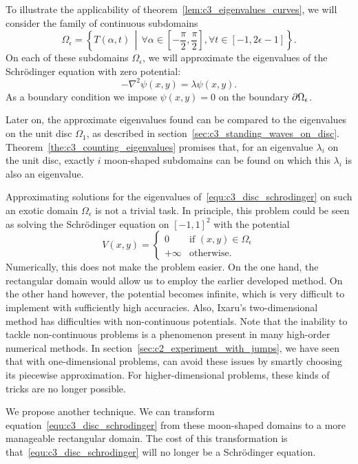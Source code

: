 To illustrate the applicability of theorem~\ref{lem:c3_eigenvalues_curves}, we will consider the family of continuous subdomains
$$
  \Omega_\epsilon = \left\{T(\alpha, t) \,\middle|\, \forall \alpha \in \left[-\frac{\pi}{2}, \frac{\pi}{2}\right], \forall t \in [-1, 2\epsilon - 1]  \right\}\text{.}
$$
On each of these subdomains $\Omega_\epsilon$, we will approximate the eigenvalues of the Schrödinger equation with zero potential:
\begin{equation}\label{equ:c3_disc_schrodinger}
  -\nabla^2 \psi(x, y) = \lambda \psi(x, y)\text{.}
\end{equation}
As a boundary condition we impose $\psi(x, y) = 0$ on the boundary $\partial\Omega_\epsilon$.

Later on, the approximate eigenvalues found can be compared to the eigenvalues on the unit disc $\Omega_1$, as described in section~\ref{sec:c3_standing_waves_on_disc}. Theorem~\ref{the:c3_counting_eigenvalues} promises that, for an eigenvalue $\lambda_i$ on the unit disc, exactly $i$ moon-shaped subdomains can be found on which this $\lambda_i$ is also an eigenvalue.

Approximating solutions for the eigenvalues of~\eqref{equ:c3_disc_schrodinger} on such an exotic domain $\Omega_\epsilon$ is not a trivial task. In principle, this problem could be seen as solving the Schrödinger equation on $[-1,1]^2$ with the potential
$$
  V(x, y) = \begin{cases}
    0       & \text{if $(x, y)\in \Omega_\epsilon$} \\
    +\infty & \text{otherwise.}
  \end{cases}
$$
Numerically, this does not make the problem easier. On the one hand, the rectangular domain would allow us to employ the earlier developed method. On the other hand however, the potential becomes infinite, which is very difficult to implement with sufficiently high accuracies. Also, Ixaru's two-dimensional method has difficulties with non-continuous potentials. Note that the inability to tackle non-continuous problems is a phenomenon present in many high-order numerical methods. In section~\ref{sec:c2_experiment_with_jumps}, we have seen that with one-dimensional problems, \matslise{} can avoid these issues by smartly choosing its piecewise approximation. For higher-dimensional problems, these kinds of tricks are no longer possible.

We propose another technique. We can transform equation~\eqref{equ:c3_disc_schrodinger} from these moon-shaped domains to a more manageable rectangular domain. The cost of this transformation is that~\eqref{equ:c3_disc_schrodinger} will no longer be a Schrödinger equation.

